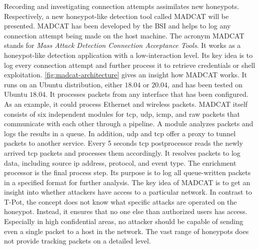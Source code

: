 Recording and investigating connection attempts assimilates new honeypots.
Respectively, a new honeypot-like detection tool called MADCAT will be presented.
MADCAT has been developed by the BSI and helps to log any connection attempt being made on the host machine.
The acronym MADCAT stands for \textit{Mass Attack Detection Connection Acceptance Tools}.
It works as a honeypot-like detection application with a low-interaction level.
Its key idea is to log every connection attempt and further process it to retrieve credentials or shell exploitation.
\autoref{fig:madcat-architecture} gives an insight how MADCAT works.
It runs on an Ubuntu distribution, either $18.04$ or $20.04$, and has been tested on Ubuntu $18.04$.
It processes packets from any interface that has been configured.
As an example, it could process Ethernet and wireless packets.
MADCAT itself consists of six independent modules for \ac{tcp}, \ac{udp}, \ac{icmp}, and raw packets that communicate with each other through a pipeline.
A module analyzes packets and logs the results in a queue.
In addition, \ac{udp} and \ac{tcp} offer a proxy to tunnel packets to another service.
Every 5 seconds \ac{tcp} postprocessor reads the newly arrived \ac{tcp} packets and processes them accordingly.
It resolves packets to log data, including source \ac{ip} address, protocol, and event type.
The enrichment processor is the final process step.
Its purpose is to log all queue-written packets in a specified format for further analysis.
The key idea of MADCAT is to get an insight into whether attackers have access to a particular network.
In contrast to T-Pot, the concept does not know what specific attacks are operated on the honeypot.
Instead, it ensures that no one else than authorized users has access.
Especially in high confidential areas, no attacker should be capable of sending even a single packet to a host in the network.
The vast range of honeypots does not provide tracking packets on a detailed level.

